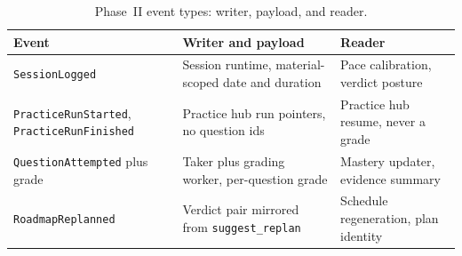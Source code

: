 \begin{table}[htbp]
\centering
\footnotesize
\caption{Phase~II event types: writer, payload, and reader.}
\label{tab:phase2-events}
\begin{tabular}{p{3.8cm} p{4.0cm} p{4.0cm}}
\toprule
\textbf{Event} & \textbf{Writer and payload} & \textbf{Reader} \\
\midrule
\texttt{SessionLogged} & Session runtime, material-scoped date and duration & Pace calibration, verdict posture \\
\texttt{PracticeRunStarted}, \texttt{PracticeRunFinished} & Practice hub run pointers, no question ids & Practice hub resume, never a grade \\
\texttt{QuestionAttempted} plus grade & Taker plus grading worker, per-question grade & Mastery updater, evidence summary \\
\texttt{RoadmapReplanned} & Verdict pair mirrored from \texttt{suggest\_replan} & Schedule regeneration, plan identity \\
\bottomrule
\end{tabular}
\end{table}
